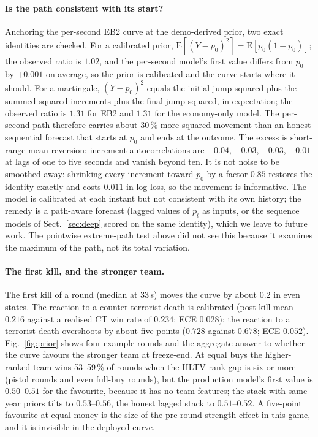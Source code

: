 \documentclass[11pt,a4paper]{article}
\begin{document}
\paragraph{Is the path consistent with its start?}
Anchoring the per-second EB2 curve at the demo-derived prior, two exact identities are checked. For a
calibrated prior, $\mathrm{E}[(Y - p_0)^2] = \mathrm{E}[p_0(1-p_0)]$; the observed ratio is $1.02$, and the
per-second model's first value differs from $p_0$ by $+0.001$ on average, so the prior is calibrated and
the curve starts where it should. For a martingale, $(Y - p_0)^2$ equals the initial jump squared plus
the summed squared increments plus the final jump squared, in expectation; the observed ratio is
$1.31$ for EB2 and $1.31$ for the economy-only model. The per-second path therefore carries about
30\,\% more squared movement than an honest sequential forecast that starts at $p_0$ and ends at the
outcome. The excess is short-range mean reversion: increment autocorrelations are $-0.04$, $-0.03$,
$-0.03$, $-0.01$ at lags of one to five seconds and vanish beyond ten. It is not noise to be smoothed
away: shrinking every increment toward $p_0$ by a factor $0.85$ restores the identity exactly and costs
$0.011$ in log-loss, so the movement is informative. The model is calibrated at each instant but not
consistent with its own history; the remedy is a path-aware forecast (lagged values of $p_t$ as inputs,
or the sequence models of Sect.~\ref{sec:deep} scored on the same identity), which we leave to future
work. The pointwise extreme-path test above did not see this because it examines the maximum of the
path, not its total variation.

\paragraph{The first kill, and the stronger team.}
The first kill of a round (median at 33\,s) moves the curve by about $0.2$ in even states. The reaction
to a counter-terrorist death is calibrated (post-kill mean $0.216$ against a realised CT win rate of
$0.234$; ECE $0.028$); the reaction to a terrorist death overshoots by about five points ($0.728$
against $0.678$; ECE $0.052$). Fig.~\ref{fig:prior} shows four example rounds and the aggregate answer
to whether the curve favours the stronger team at freeze-end. At equal buys the higher-ranked team wins
53--59\,\% of rounds when the HLTV rank gap is six or more (pistol rounds and even full-buy rounds),
but the production model's first value is $0.50$--$0.51$ for the favourite, because it has no team
features; the stack with same-year priors tilts to $0.53$--$0.56$, the honest lagged stack to
$0.51$--$0.52$. A five-point favourite at equal money is the size of the pre-round strength effect in
this game, and it is invisible in the deployed curve.
\end{document}
